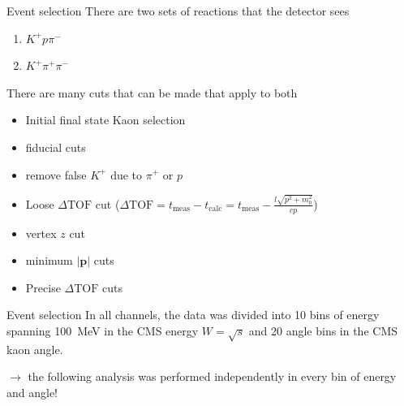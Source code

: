 \documentclass[11pt,aspectratio=1610,dvipsnames]{beamer}
\begin{document}
\begin{frame}{Event selection}
	There are two sets of reactions that the detector sees
	
	\begin{enumerate}
		\item $K^+p\pi^-$
		\item $K^+\pi^+\pi^-$
	\end{enumerate}
There are many cuts that can be made that apply to both
	\begin{tcolorbox}[colback=black!10,colframe=gray!20!black,title=Initial selection of particles] 
		\begin{itemize}
			\item Initial final state Kaon selection
			\item fiducial cuts
			\item remove false $K^+$ due to $\pi^+$ or $p$
			\item Loose $\Delta\text{TOF}$ cut ($\Delta\text{TOF}=t_\text{meas}-t_\text{calc}=t_\text{meas}-\frac{l\sqrt{p^2+m_0^2}}{cp}$)
			\item vertex $z$ cut
			\item minimum $|\mathbf{p}|$ cuts
			\item Precise $\Delta\text{TOF}$ cuts
			
		\end{itemize}
	\end{tcolorbox}
\end{frame}
\begin{frame}{Event selection}
In all channels, the data was divided into 10 bins of energy spanning \SI{100}{\mega\eV} in the CMS energy $W=\sqrt{s}$ and 20 angle bins in the CMS kaon angle.

$\to$ the following analysis was performed independently in every bin of energy and angle!
\end{frame}
\end{document}
